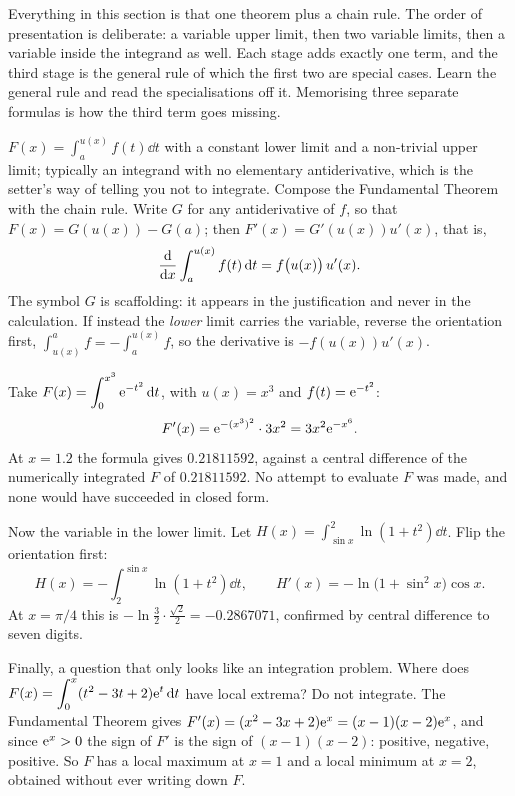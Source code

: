 Everything in this section is that one theorem plus a chain rule. The order of presentation is deliberate: a variable upper limit, then two variable limits, then a variable inside the integrand as well. Each stage adds exactly one term, and the third stage is the general rule of which the first two are special cases. Learn the general rule and read the specialisations off it. Memorising three separate formulas is how the third term goes missing.

\cue $F(x)=\int_{a}^{u(x)}f(t)\dd t$ with a constant lower limit and a non-trivial upper limit; typically an integrand with no elementary antiderivative, which is the setter's way of telling you not to integrate.
\method Compose the Fundamental Theorem with the chain rule. Write $G$ for any antiderivative of $f$, so that $F(x)=G(u(x))-G(a)$; then $F'(x)=G'(u(x))u'(x)$, that is,
\[
\frac{\mathrm{d}}{\mathrm{d}x}\int_{a}^{u(x)}f(t)\,\mathrm{d} t=f\bigl(u(x)\bigr)\,u'(x).
\]
The symbol $G$ is scaffolding: it appears in the justification and never in the calculation. If instead the \emph{lower} limit carries the variable, reverse the orientation first, $\int_{u(x)}^{a}f=-\int_{a}^{u(x)}f$, so the derivative is $-f(u(x))u'(x)$.

\begin{worked}
Take $F(x)=\displaystyle\int_{0}^{x^{3}}\mathrm{e}^{-t^{2}}\,\mathrm{d} t$, with $u(x)=x^{3}$ and $f(t)=\mathrm{e}^{-t^{2}}$:
\[
F'(x)=\mathrm{e}^{-(x^{3})^{2}}\cdot3x^{2}=3x^{2}\mathrm{e}^{-x^{6}} .
\]
At $x=1.2$ the formula gives $0.21811592$, against a central difference of the numerically integrated $F$ of $0.21811592$. No attempt to evaluate $F$ was made, and none would have succeeded in closed form.

Now the variable in the lower limit. Let $H(x)=\displaystyle\int_{\sin x}^{2}\ln(1+t^{2})\dd t$. Flip the orientation first:
\[
H(x)=-\int_{2}^{\sin x}\ln(1+t^{2})\dd t,\qquad H'(x)=-\ln\bigl(1+\sin^{2}x\bigr)\cos x .
\]
At $x=\pi/4$ this is $-\ln\tfrac32\cdot\tfrac{\sqrt2}{2}=-0.2867071$, confirmed by central difference to seven digits.

Finally, a question that only looks like an integration problem. Where does $F(x)=\displaystyle\int_{0}^{x}(t^{2}-3t+2)\mathrm{e}^{t}\,\mathrm{d} t$ have local extrema? Do not integrate. The Fundamental Theorem gives $F'(x)=(x^{2}-3x+2)\mathrm{e}^{x}=(x-1)(x-2)\mathrm{e}^{x}$, and since $\mathrm{e}^{x}>0$ the sign of $F'$ is the sign of $(x-1)(x-2)$: positive, negative, positive. So $F$ has a local maximum at $x=1$ and a local minimum at $x=2$, obtained without ever writing down $F$.
\end{worked}

